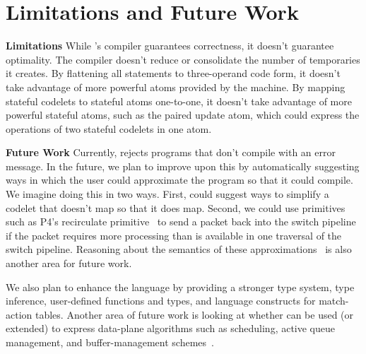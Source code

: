 \section{Limitations and Future Work}
\label{s:limitations}

\textbf{Limitations}
While \pktlanguage's compiler guarantees correctness, it doesn't guarantee
optimality.  The \pktlanguage compiler doesn't reduce or consolidate the number
of temporaries it creates. By flattening all statements to three-operand code
form, it doesn't take advantage of more powerful atoms provided by the
\absmachine machine. By mapping stateful codelets to stateful atoms
one-to-one, it doesn't take advantage of more powerful stateful atoms, such as
the paired update atom, which could express the operations of two stateful
codelets in one atom.

\textbf{Future Work}
Currently, \pktlanguage rejects programs that don't compile with an error
message.  In the future, we plan to improve upon this by automatically
suggesting ways in which the user could approximate the program so that it
could compile. We imagine doing this in two ways. First, \pktlanguage could
suggest ways to simplify a codelet that doesn't map so that it does map.
Second, we could use primitives such as P4's recirculate
primitive~\cite{p4spec} to send a packet back into the switch pipeline if the
packet requires more processing than is available in one traversal of the
switch pipeline. Reasoning about the semantics of these
approximations~\cite{sampsonApprox, chisel} is also another area for future
work.

We also plan to enhance the \pktlanguage language by providing a stronger type
system, type inference, user-defined functions and types, and language
constructs for match-action tables. Another area of future work is looking at
whether \pktlanguage can be used (or extended) to express data-plane algorithms
such as scheduling, active queue management, and buffer-management
schemes~\cite{broadcom_buffer}.
